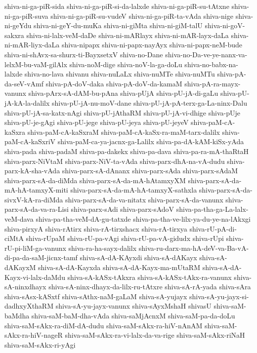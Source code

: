 {shiva-ni-ga-piR-sida
shiva-ni-ga-piR-si-da-lalxde
shiva-ni-ga-piR-su-tAtxne
shiva-ni-ga-piR-suva
shiva-ni-ga-piR-su-vudeV
shiva-ni-ga-piR-ta-vAda
shiva-nige
shiva-ni-geYdu
shiva-ni-geY-du-muKa
shiva-ni-giMta
shiva-ni-giM-talU
shiva-ni-goV-sakxra
shiva-ni-lalx-veM-daDe
shiva-ni-mARlayx
shiva-ni-mAR-layx-daLa
shiva-ni-mAR-liyx-daLa
shiva-nipapx
shiva-ni-papx-nayAyx
shiva-ni-papx-neM-bude
shiva-ni-shAvx-sa-shurx-ti-BayxsetxV
shiva-no-Dane
shiva-no-Da-ve-ye-nanx-va-lelxM-bu-vaM-gilAlx
shiva-noM-dige
shiva-noV-la-ga-doLu
shiva-no-babx-na-lalxde
shiva-no-lava
shivanu
shiva-nuLaLx
shiva-nuMTe
shiva-nuMTu
shiva-pA-da-seV-vAmf
shiva-pA-doV-daka
shiva-pA-doV-da-kamaM
shiva-pA-ra-mayx-vanunx
shiva-pArx-sA-dAM-bu-pAna
shiva-pUjA
shiva-pU-jA-di-gaLu
shiva-pU-jA-kA-la-dalilx
shiva-pU-jA-nu-moV-dane
shiva-pU-jA-pA-terx-ga-La-ninx-Dalu
shiva-pU-jA-sa-katx-nAgi
shiva-pU-jAthaRM
shiva-pU-jA-vi-dhige
shiva-pUje
shiva-pU-je-gAgi
shiva-pU-jege
shiva-pU-jeya
shiva-pU-jeyeV
shiva-paM-cA-kaSxra
shiva-paM-cA-kaSxraM
shiva-paM-cA-kaSx-ra-maM-tarx-dalilx
shiva-paM-cA-kaSxriV
shiva-paM-ca-ya-jacnx-ga-Lalilx
shiva-pa-dA-kAM-kiSx-yAda
shiva-pada
shiva-padaM
shiva-pa-dakekx
shiva-pa-dava
shiva-pa-ra-mA-thaRtaH
shiva-parx-NiVtaM
shiva-parx-NiV-ta-vAda
shiva-parx-dhA-na-vA-dudu
shiva-parx-kA-sha-vAda
shiva-parx-sA-dAnanx
shiva-parx-sAda
shiva-parx-sAdaM
shiva-parx-sA-da-diMda
shiva-parx-sA-da-mA-hAtamxyXM
shiva-parx-sA-da-mA-hA-tamxyX-miti
shiva-parx-sA-da-mA-hA-tamxyX-sathxla
shiva-parx-sA-da-sivxV-kA-ra-diMda
shiva-parx-sA-da-va-nitatx
shiva-parx-sA-da-vanunx
shiva-parx-sA-da-va-ra-Lisi
shiva-parx-sAdi
shiva-parx-sAdoV
shiva-pa-tha-ga-La-lalx-veM-dava
shiva-pa-tha-veM-dA-gu-tatxde
shiva-pa-tha-ve-lilx-ya-du-ye-na-lAkxgi
shiva-pirxyA
shiva-rAtirx
shiva-rA-tirxshacx
shiva-rA-tirxya
shiva-rU-pA-di-ciMtA
shiva-rUpaM
shiva-rU-pa-vAgi
shiva-rU-pa-vA-gidudx
shiva-rUpi
shiva-rU-pi-liM-ga-vanunx
shiva-ra-ha-sayx-dalilx
shiva-ru-darx-ma-hA-deV-va-Ba-vA-di-pa-da-saM-jicnx-tamf
shiva-sA-dA-KAyxdi
shiva-sA-dAKayx
shiva-sA-dAKayxM
shiva-sA-dA-Kayxda
shiva-sA-dA-Kayx-ma-mUtaRM
shiva-sA-dA-Kayx-vi-lalx-daMdu
shiva-sA-kASx-tAkxra
shiva-sA-kASx-tAkx-ra-vanunx
shiva-sA-ninxdhayx
shiva-sA-ninx-dhayx-da-lilx-ru-tAtxre
shiva-sA-rA-yada
shiva-sAra
shiva-sAsx-kASxtf
shiva-sAthx-naM-gaLaM
shiva-sA-yujayx
shiva-sA-yu-jayx-si-dadhxyXthaRM
shiva-sA-yu-jayx-vanunx
shiva-sAyxMshaH
shivasU
shiva-saM-baMdha
shiva-saM-baM-dha-vAda
shiva-saMjAcnxM
shiva-saM-pa-da-doLu
shiva-saM-sAkx-ra-diM-dA-dudu
shiva-saM-sAkx-ra-hiV-nAnAM
shiva-saM-sAkx-ra-hiV-nageR
shiva-saM-sAkx-ra-vi-lalx-da-va-rige
shiva-saM-sAkx-riNaH
shiva-saM-sAkx-ri-yAgi
}
